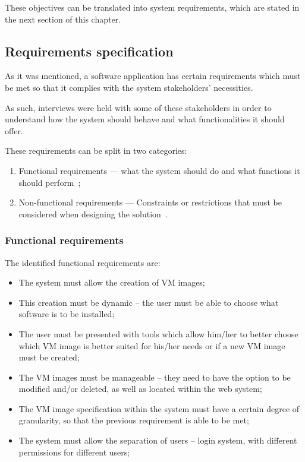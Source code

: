 These objectives can be translated into system requirements, which are stated in the next section of this chapter.

\subsection{Requirements specification}\label{subsec:requirements}

As it was mentioned, a software application has certain requirements which must be met so that it complies with the system stakeholders' necessities.

As such, interviews were held with some of these stakeholders in order to understand how the system should behave and what functionalities it should offer.

These requirements can be split in two categories:

\begin{enumerate}
\item Functional requirements --- what the system should do and what functions it should perform~\cite{funct-reqs};
\item Non-functional requirements --- Constraints or restrictions that must be considered when designing the solution~\cite{nonfunct-reqs}.
\end{enumerate}

\subsubsection{Functional requirements}\label{subsubsec:funct-reqs}

The identified functional requirements are:

\begin{itemize}
\item The system must allow the creation of VM images;
\item This creation must be dynamic -- the user must be able to choose what software is to be installed;
\item The user must be presented with tools which allow him/her to better choose which VM image is better suited for his/her needs or if a new VM image must be created;
\item The VM images must be manageable -- they need to have the option to be modified and/or deleted, as well as located within the web system;
\item The VM image specification within the system must have a certain degree of granularity, so that the previous requirement is able to be met;
\item The system must allow the separation of users -- login system, with different permissions for different users;
\end{itemize}

